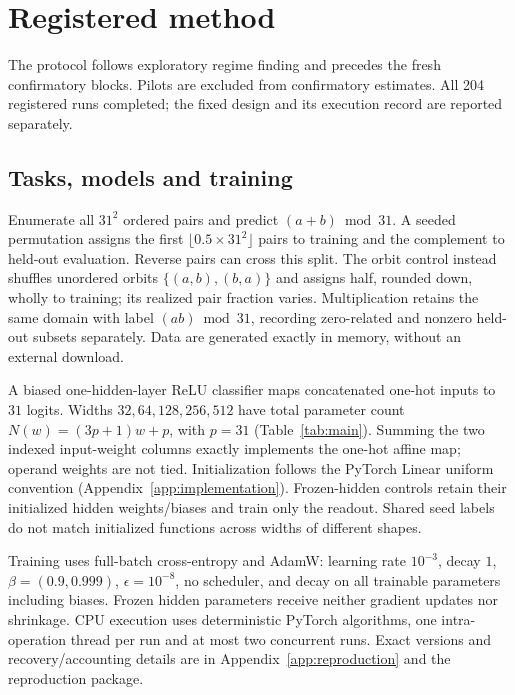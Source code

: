 \section{Registered method}
\label{sec:method}
The protocol follows exploratory regime finding and precedes the fresh confirmatory blocks. Pilots are excluded from confirmatory estimates. All 204 registered runs completed; the fixed design and its execution record are reported separately.

\subsection{Tasks, models and training}
Enumerate all $31^2$ ordered pairs and predict $(a+b)\bmod31$. A seeded permutation assigns the first $\lfloor0.5\times31^2\rfloor$ pairs to training and the complement to held-out evaluation. Reverse pairs can cross this split. The orbit control instead shuffles unordered orbits $\{(a,b),(b,a)\}$ and assigns half, rounded down, wholly to training; its realized pair fraction varies. Multiplication retains the same domain with label $(ab)\bmod31$, recording zero-related and nonzero held-out subsets separately. Data are generated exactly in memory, without an external download.

A biased one-hidden-layer ReLU classifier maps concatenated one-hot inputs to $31$ logits. Widths $32,64,128,256,512$ have total parameter count $N(w)=(3p+1)w+p$, with $p=31$ (Table~\ref{tab:main}). Summing the two indexed input-weight columns exactly implements the one-hot affine map; operand weights are not tied. Initialization follows the PyTorch Linear uniform convention (Appendix~\ref{app:implementation}). Frozen-hidden controls retain their initialized hidden weights/biases and train only the readout. Shared seed labels do not match initialized functions across widths of different shapes.

Training uses full-batch cross-entropy and AdamW: learning rate $10^{-3}$, decay $1$, $\beta=(0.9,0.999)$, $\epsilon=10^{-8}$, no scheduler, and decay on all trainable parameters including biases. Frozen hidden parameters receive neither gradient updates nor shrinkage. CPU execution uses deterministic PyTorch algorithms, one intra-operation thread per run and at most two concurrent runs. Exact versions and recovery/accounting details are in Appendix~\ref{app:reproduction} and the reproduction package.

